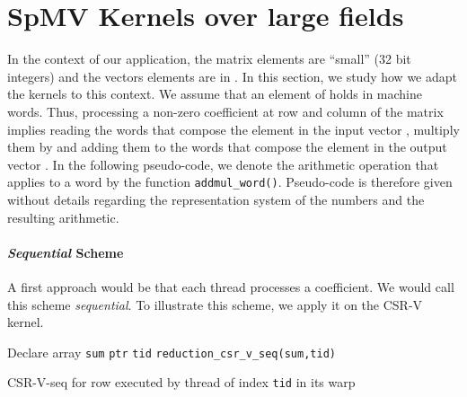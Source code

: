 \documentclass[runningheads,orivec]{llncs}
\begin{document}
\section{SpMV Kernels over large fields}
\label{sec::adaptation large integers}

In the context of our application, the matrix elements are ``small'' (32 bit integers) and the vectors elements are in . In this section, we study how we adapt the kernels to this context. We assume that an element of  holds in  machine words. Thus, processing a non-zero coefficient  at row  and column  of the matrix implies reading the  words that compose the  element in the input vector , multiply them by  and adding them to the  words that compose the  element in the output vector . In the following pseudo-code, we denote the arithmetic operation that applies to a word by the function \texttt{addmul\_word()}. Pseudo-code is therefore given without details regarding the representation system of the numbers and the resulting arithmetic.

\vspace*{-0.25cm}
\paragraph{\bf \textit{Sequential} Scheme}

A first approach would be that each thread processes a coefficient. We would call this scheme \textit{sequential}. To illustrate this scheme, we apply it on the CSR-V kernel.



\begin{algorithm}[H]
 \small 
 \BlankLine
 Declare array \texttt{sum} 
  \texttt{ptr}\textsubscript{}  \texttt{tid}\;
   \texttt{reduction\_csr\_v\_seq(sum,tid)}\;
 \caption{\small CSR-V-seq for row  executed by thread of index \texttt{tid} in its warp}
 \label{algo::csr vector-sequential}
\end{algorithm}
\end{document}

